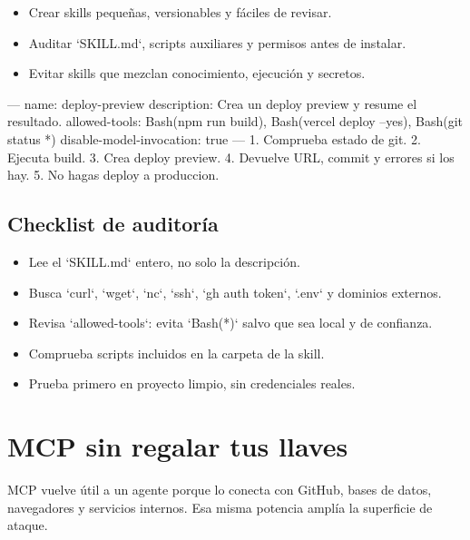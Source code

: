 \documentclass[11pt,a4paper]{book}
\begin{document}
\begin{itemize}\item Crear skills pequeñas, versionables y fáciles de revisar.\end{itemize}
\begin{itemize}\item Auditar `SKILL.md`, scripts auxiliares y permisos antes de instalar.\end{itemize}
\begin{itemize}\item Evitar skills que mezclan conocimiento, ejecución y secretos.\end{itemize}
\begin{codebox}
---
name: deploy-preview
description: Crea un deploy preview y resume el resultado.
allowed-tools: Bash(npm run build), Bash(vercel deploy --yes), Bash(git status *)
disable-model-invocation: true
---
1. Comprueba estado de git.
2. Ejecuta build.
3. Crea deploy preview.
4. Devuelve URL, commit y errores si los hay.
5. No hagas deploy a produccion.
\end{codebox}
\section{Checklist de auditoría}
\begin{itemize}\item Lee el `SKILL.md` entero, no solo la descripción.\end{itemize}
\begin{itemize}\item Busca `curl`, `wget`, `nc`, `ssh`, `gh auth token`, `.env` y dominios externos.\end{itemize}
\begin{itemize}\item Revisa `allowed-tools`: evita `Bash(*)` salvo que sea local y de confianza.\end{itemize}
\begin{itemize}\item Comprueba scripts incluidos en la carpeta de la skill.\end{itemize}
\begin{itemize}\item Prueba primero en proyecto limpio, sin credenciales reales.\end{itemize}
\chapter{MCP sin regalar tus llaves}
MCP vuelve útil a un agente porque lo conecta con GitHub, bases de datos, navegadores y servicios internos. Esa misma potencia amplía la superficie de ataque.
\end{document}

